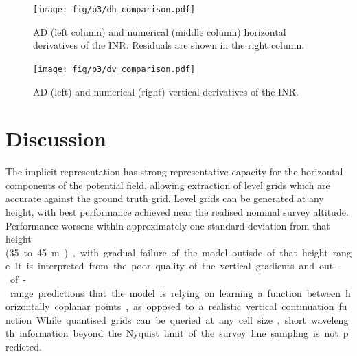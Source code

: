 \documentclass[manuscript.tex]{subfiles}
\begin{document}
\begin{figure}[hbt]
    \centering{}
    \texttt{[image: fig/p3/dh\_comparison.pdf]}
    \caption[Horizontal derivatives]{AD (left column) and numerical (middle column) horizontal derivatives of the INR\@. Residuals are shown in the right column.}
    \label{fig:hori_grad}
\end{figure}

\begin{figure}[hbt]
    \centering{}
    \texttt{[image: fig/p3/dv\_comparison.pdf]}
    \caption[Vertical derivative]{AD (left) and numerical (right) vertical derivatives of the INR\@.}
    \label{fig:vert_grad}
\end{figure}




\section{Discussion}
The implicit representation has strong representative capacity for the horizontal components of the potential field, allowing extraction of level grids which are accurate against the ground truth grid.
Level grids can be generated at any height, with best performance achieved near the realised nominal survey altitude.
Performance worsens within approximately one standard deviation from that height (\SI{35} to \SI{45}{\m}), with gradual failure of the model outisde of that height range.
It is interpreted from the poor quality of the vertical gradients and out-of-range predictions that the model is relying on learning a function between horizontally coplanar points, as opposed to a realistic vertical continuation function.
While quantised grids can be queried at any cell size, short wavelength information beyond the Nyquist limit of the survey line sampling is not predicted.

\end{document}
